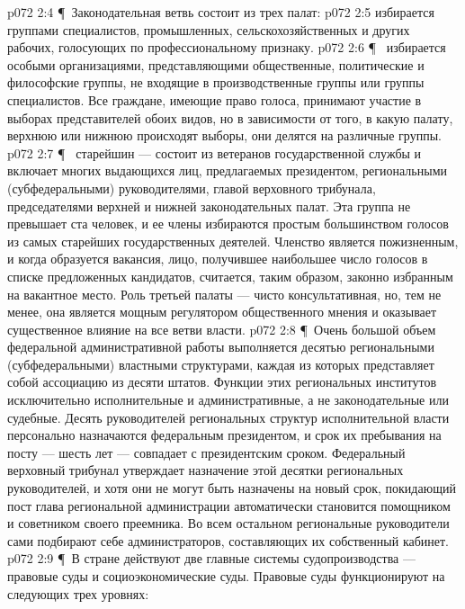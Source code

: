 \vs p072 2:4 \P\ Законодательная ветвь состоит из трех палат:
\vs p072 2:5 \bibnobreakspace {} избирается группами специалистов, промышленных, сельскохозяйственных и других рабочих, голосующих по профессиональному признаку.
\vs p072 2:6 \P\ \bibnobreakspace {} избирается особыми организациями, представляющими общественные, политические и философские группы, не входящие в производственные группы или группы специалистов. Все граждане, имеющие право голоса, принимают участие в выборах представителей обоих видов, но в зависимости от того, в какую палату, верхнюю или нижнюю происходят выборы, они делятся на различные группы.
\vs p072 2:7 \P\ \bibnobreakspace {} старейшин --- состоит из ветеранов государственной службы и включает многих выдающихся лиц, предлагаемых президентом, региональными (субфедеральными) руководителями, главой верховного трибунала, председателями верхней и нижней законодательных палат. Эта группа не превышает ста человек, и ее члены избираются простым большинством голосов из самых старейших государственных деятелей. Членство является пожизненным, и когда образуется вакансия, лицо, получившее наибольшее число голосов в списке предложенных кандидатов, считается, таким образом, законно избранным на вакантное место. Роль третьей палаты --- чисто консультативная, но, тем не менее, она является мощным регулятором общественного мнения и оказывает существенное влияние на все ветви власти.
\vs p072 2:8 \P\ Очень большой объем федеральной административной работы выполняется десятью региональными (субфедеральными) властными структурами, каждая из которых представляет собой ассоциацию из десяти штатов. Функции этих региональных институтов исключительно исполнительные и административные, а не законодательные или судебные. Десять руководителей региональных структур исполнительной власти персонально назначаются федеральным президентом, и срок их пребывания на посту --- шесть лет --- совпадает с президентским сроком. Федеральный верховный трибунал утверждает назначение этой десятки региональных руководителей, и хотя они не могут быть назначены на новый срок, покидающий пост глава региональной администрации автоматически становится помощником и советником своего преемника. Во всем остальном региональные руководители сами подбирают себе администраторов, составляющих их собственный кабинет.
\vs p072 2:9 \P\ В стране действуют две главные системы судопроизводства --- правовые суды и социоэкономические суды. Правовые суды функционируют на следующих трех уровнях:
